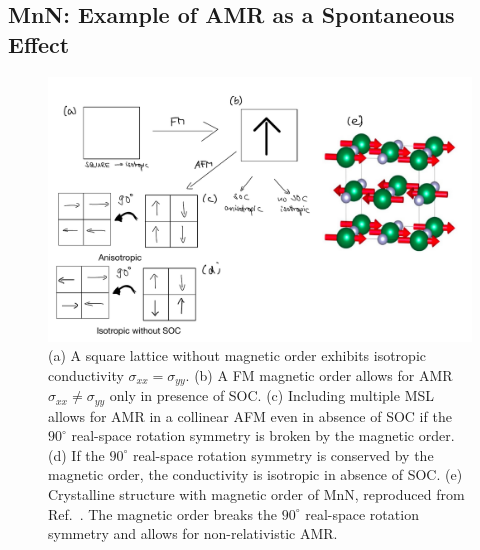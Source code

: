 \documentclass[prb,showpacs,amsmath,amssymb,superscriptaddress,twocolumn,floatfix]{revtex4-1}
\begin{document}
\subsection{MnN: Example of AMR as a Spontaneous Effect}
\label{sec_I_MnN}

\begin{figure}
	\centering
	\includegraphics[width=1\linewidth]{img/MnN_sketch}
	\caption{(a) A square lattice without magnetic order exhibits isotropic conductivity $\sigma_{xx} = \sigma_{yy}$. (b) A FM magnetic order allows for AMR $\sigma_{xx} \neq \sigma_{yy}$ only in presence of SOC. (c) Including multiple MSL allows for AMR in a collinear AFM even in absence of SOC if the $90^\circ$ real-space rotation symmetry is broken by the magnetic order. (d) If the $90^\circ$ real-space rotation symmetry is conserved by the magnetic order, the conductivity is isotropic in absence of SOC. (e) Crystalline structure with magnetic order of MnN, reproduced from Ref.~\cite{Dunz:2020}. The magnetic order breaks the $90^\circ$ real-space rotation symmetry and allows for non-relativistic AMR.}
	\label{fig:mnnsketch}
\end{figure}
\end{document}
